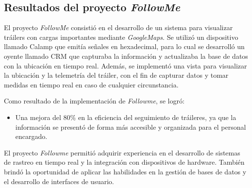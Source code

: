 \documentclass[protocolo.tex]{subfiles}
\begin{document}
\subsection{Resultados del proyecto \textit{FollowMe}}

El proyecto \textit{FollowMe} consistió en el desarrollo de un sistema para visualizar tráilers con cargas importantes mediante \textit{GoogleMaps}.  Se utilizó un dispositivo llamado Calamp que emitía señales en hexadecimal, para lo cual se desarrolló un oyente llamado CRM que capturaba la información y  actualizaba la base de datos con la ubicación en tiempo real.  Además, se implementó una vista para visualizar la ubicación y la telemetría del tráiler, con el fin de capturar datos y tomar medidas en tiempo real en caso de cualquier circunstancia.\vspace{4mm}

Como resultado de la implementación de \textit{Followme}, se logró:

\begin{itemize}
\item Una mejora del 80\% en la eficiencia del seguimiento de tráileres, ya que la información se  presentó  de forma más accesible y organizada para el personal encargado.
\end{itemize}

El proyecto \textit{Followme} permitió adquirir experiencia en el desarrollo de sistemas de rastreo en tiempo real y la integración con dispositivos de hardware. También brindó la oportunidad de aplicar las habilidades en la gestión de bases de datos y el desarrollo de interfaces de usuario.
\end{document}
